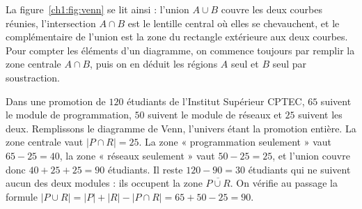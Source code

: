 \begin{center}
\label{ch1:fig:venn}
\end{center}

La figure~\ref{ch1:fig:venn} se lit ainsi : l'union $A \cup B$ couvre les deux courbes réunies, l'intersection $A \cap B$ est le lentille central où elles se chevauchent, et le complémentaire de l'union est la zone du rectangle extérieure aux deux courbes. Pour compter les éléments d'un diagramme, on commence toujours par remplir la zone centrale $A \cap B$, puis on en déduit les régions $A$ seul et $B$ seul par soustraction.

\begin{exemple}
Dans une promotion de $120$ étudiants de l'Institut Supérieur CPTEC, $65$ suivent le module de programmation, $50$ suivent le module de réseaux et $25$ suivent les deux. Remplissons le diagramme de Venn, l'univers étant la promotion entière. La zone centrale vaut $|P \cap R| = 25$. La zone « programmation seulement » vaut $65 - 25 = 40$, la zone « réseaux seulement » vaut $50 - 25 = 25$, et l'union couvre donc $40 + 25 + 25 = 90$ étudiants. Il reste $120 - 90 = 30$ étudiants qui ne suivent aucun des deux modules : ils occupent la zone $\overline{P \cup R}$. On vérifie au passage la formule $|P \cup R| = |P| + |R| - |P \cap R| = 65 + 50 - 25 = 90$.
\end{exemple}

